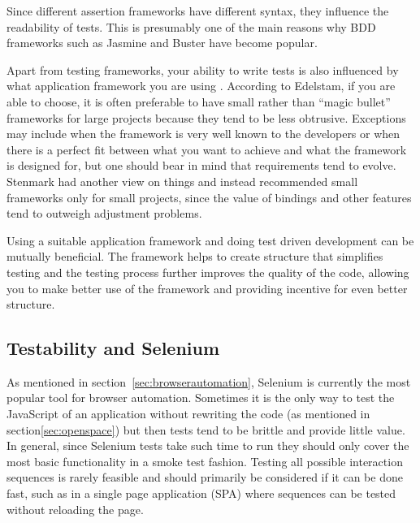 \documentclass[11pt]{article}
\begin{document}
Since different assertion frameworks have different syntax, they influence the readability of tests. This is presumably one of the main reasons why BDD frameworks such as Jasmine and Buster have become popular. \cite[question~7]{Ahnve}

Apart from testing frameworks, your ability to write tests is also influenced by what application framework you are using \cite[question~8]{Ahnve}. According to Edelstam, if you are able to choose, it is often preferable to have small rather than ``magic bullet'' frameworks for large projects because they tend to be less obtrusive. Exceptions may include when the framework is very well known to the developers or when there is a perfect fit between what you want to achieve and what the framework is designed for, but one should bear in mind that requirements tend to evolve. \cite[questions~48-50]{Edelstam} Stenmark had another view on things and instead recommended small frameworks only for small projects, since the value of bindings and other features tend to outweigh adjustment problems. \cite[questions~12-14]{Stenmark}

Using a suitable application framework and doing test driven development can be mutually beneficial. The framework helps to create structure that simplifies testing and the testing process further improves the quality of the code, allowing you to make better use of the framework and providing incentive for even better structure. \cite[question~15]{Stenmark}

\subsection{Testability and Selenium}

As mentioned in section~\ref{sec:browserautomation}, Selenium is currently the most popular tool for browser automation. Sometimes it is the only way to test the JavaScript of an application without rewriting the code\cite[question~43]{Stenmark} (as mentioned in section\ref{sec:openspace}) but then tests tend to be brittle and provide little value. In general, since Selenium tests take such time to run they should only cover the most basic functionality in a smoke test fashion. \cite[questions~16-17]{Stenmark}\cite[question~21]{Ahnve} Testing all possible interaction sequences is rarely feasible and should primarily be considered if it can be done fast, such as in a single page application (SPA) where sequences can be tested without reloading the page. \cite[question~44]{Edelstam}
\end{document}
